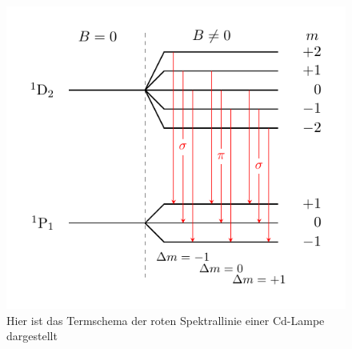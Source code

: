 \FloatBarrier
\begin{figure}[!h]
\centering
\includegraphics[scale=1.15]{../Grafiken/termschema_rot.pdf}
\caption{Hier ist das Termschema der roten Spektrallinie einer Cd-Lampe dargestellt\label{fig:termschema_rot}}
\end{figure}
\FloatBarrier
